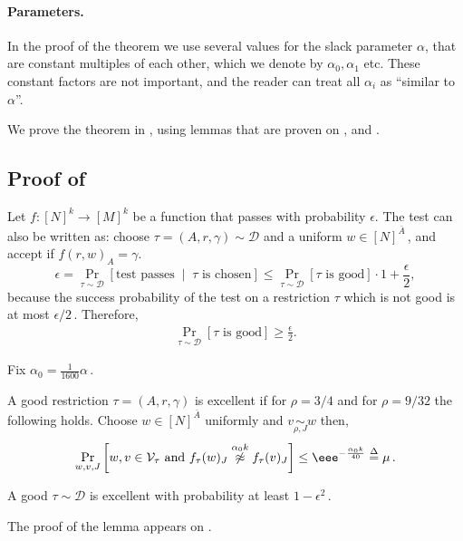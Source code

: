 \documentclass{toc}
\newcommand{\Prob}[2][]{\Pr_{{#1}}\left[#2\right]} %
\newcommand{\brac}[1]{[#1]} %
\newcommand{\given}{\;\middle\vert\;} %
\newcommand\f{f} %
\def\eqdef{\stackrel{{\Delta}}{=}}
\newcommand\neqg[1]{\stackrel{{#1}}{ \not\approx}} %
\newcommand\cons{\mathcal{V}} %
\newcommand\cor[1]{\underset{\scriptscriptstyle#1}{\sim}} %
\newcommand\rest[1]{{\bar{#1}}}  %
\begin{document}
\paragraph{Parameters.}
In the proof of the theorem we use several values for the slack parameter $\alpha$, that are constant multiples of each other, which we denote by $\alpha_0,\alpha_1$ etc. These constant factors are not important, and the reader can treat all $\alpha_i$ as ``similar to $\alpha$''.



We prove the theorem in , using lemmas that are proven on ,  and .


\subsection{Proof of }\label{sec:local outline}
%
Let $\f:[N]^k\rightarrow[M]^k$ be a function that passes  with probability $\epsilon$. The test can also be written as: choose $\tau=(A,r,\gamma)\sim\mathcal{D}$ and a uniform $w\in[N]^\rest{A}$\,, and accept if $f(r,w)_A = \gamma$. 
\[ \epsilon = \Prob[\tau\sim\mathcal{D}]{\textrm{test passes} \given \tau \textrm{ is chosen}} \leq \Prob[\tau\sim\mathcal{D}]{\tau\textrm{ is good}}\cdot 1 + \frac{\epsilon}{2}, \]
because the success probability of the test on a restriction $\tau$ which is not good is at most 
%
$\epsilon/2$\,. %
Therefore,
\begin{align}\label{eq:good}
\Prob[\tau\sim\mathcal{D}]{\tau\textrm{ is good}} \geq \frac{\epsilon}{2}.
\end{align}

Fix  $\alpha_0 = \frac{1}{1600}\alpha$\,. 
\begin{definition}\label{def:excellence}
	A good restriction $\tau = (A,r,\gamma)$ is excellent if
		for 
		 $\rho = 3/4$ %
		 and for 
		 $\rho = 9/32$ %
		  the following holds. Choose $w\in\brac{N}^{\rest{A}}$ uniformly and $v\cor{\rho,J}w$ then,
		\begin{align}\label{eq:excellent}
		\Prob[w,v,J]{ w,v\in\cons_\tau \hbox{ and } f_\tau(w)_J \neqg{\alpha_0 k} f_\tau(v)_J} \leq  \eee^{-\frac{\alpha_0 k}{40}}\eqdef \mu\,. %
		\end{align} 
\end{definition}

\begin{lemma}\label{lem:good is exc}
	A good $\tau\sim\mathcal{D}$ is excellent with probability at least $1-\epsilon^2$\,.
\end{lemma}
The proof of the lemma appears on .
\end{document}
